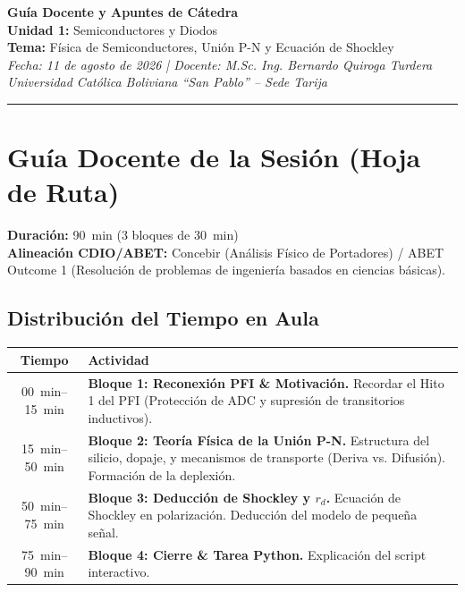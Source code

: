 \documentclass[11pt, a4paper]{article}
\begin{document}
\begin{center}
    {\LARGE \textbf{Guía Docente y Apuntes de Cátedra}}\\[0.5cm]
    {\large \textbf{Unidad 1:} Semiconductores y Diodos}\\
    {\large \textbf{Tema:} Física de Semiconductores, Unión P-N y Ecuación de Shockley}\\[0.3cm]
    \textit{Fecha: 11 de agosto de 2026 \quad | \quad Docente: M.Sc. Ing. Bernardo Quiroga Turdera}\\
    \textit{Universidad Católica Boliviana ``San Pablo'' -- Sede Tarija}
    \vspace{0.5cm}
    \hrule
\end{center}

\vspace{0.5cm}

\section{Guía Docente de la Sesión (Hoja de Ruta)}

\textbf{Duración:} \qty{90}{\minute} (3 bloques de \qty{30}{\minute}) \\
\textbf{Alineación CDIO/ABET:} Concebir (Análisis Físico de Portadores) / ABET Outcome 1 (Resolución de problemas de ingeniería basados en ciencias básicas).

\subsection*{Distribución del Tiempo en Aula}
\begin{center}
\begin{tabularx}{\textwidth}{@{} c X @{}}
\toprule
\textbf{Tiempo} & \textbf{Actividad} \\
\midrule
\qtyrange{00}{15}{\minute} & \textbf{Bloque 1: Reconexión PFI \& Motivación.} Recordar el Hito 1 del PFI (Protección de ADC y supresión de transitorios inductivos). \\
\qtyrange{15}{50}{\minute} & \textbf{Bloque 2: Teoría Física de la Unión P-N.} Estructura del silicio, dopaje, y mecanismos de transporte (Deriva vs. Difusión). Formación de la deplexión. \\
\qtyrange{50}{75}{\minute} & \textbf{Bloque 3: Deducción de Shockley y $r_d$.} Ecuación de Shockley en polarización. Deducción del modelo de pequeña señal. \\
\qtyrange{75}{90}{\minute} & \textbf{Bloque 4: Cierre \& Tarea Python.} Explicación del script interactivo. \\
\bottomrule
\end{tabularx}
\end{center}
\end{document}
